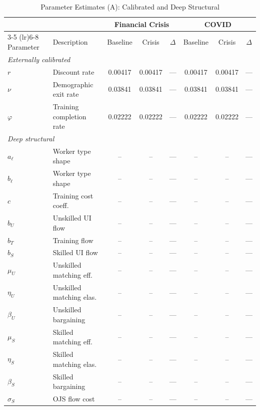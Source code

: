 \begin{table}[htbp]
  \centering
  \caption{Parameter Estimates (A): Calibrated and Deep Structural}
  \label{tab:param_estimates_a}
  \small
  \begin{tabular}{llcccccc}
    \toprule
    & & \multicolumn{3}{c}{Financial Crisis} & \multicolumn{3}{c}{COVID} \\
    \cmidrule(lr){3-5} \cmidrule(lr){6-8}
    Parameter & Description & Baseline & Crisis & $\Delta$ & Baseline & Crisis & $\Delta$ \\
    \midrule
    \multicolumn{8}{l}{\textit{Externally calibrated}} \\[2pt]
    \quad $r$ & Discount rate & 0.00417 & 0.00417 & --- & 0.00417 & 0.00417 & --- \\
    \quad $\nu$ & Demographic exit rate & 0.03841 & 0.03841 & --- & 0.03841 & 0.03841 & --- \\
    \quad $\varphi$ & Training completion rate & 0.02222 & 0.02222 & --- & 0.02222 & 0.02222 & --- \\
    [4pt]
    \hline
    \multicolumn{8}{l}{\textit{Deep structural}} \\[2pt]
    \quad $a_\ell$ & Worker type shape & -- & -- & --- & -- & -- & --- \\
    \quad $b_\ell$ & Worker type shape & -- & -- & --- & -- & -- & --- \\
    \quad $c$ & Training cost coeff. & -- & -- & --- & -- & -- & --- \\
    \quad $b_U$ & Unskilled UI flow & -- & -- & --- & -- & -- & --- \\
    \quad $b_T$ & Training flow & -- & -- & --- & -- & -- & --- \\
    \quad $b_S$ & Skilled UI flow & -- & -- & --- & -- & -- & --- \\
    \quad $\mu_U$ & Unskilled matching eff. & -- & -- & --- & -- & -- & --- \\
    \quad $\eta_U$ & Unskilled matching elas. & -- & -- & --- & -- & -- & --- \\
    \quad $\beta_U$ & Unskilled bargaining & -- & -- & --- & -- & -- & --- \\
    \quad $\mu_S$ & Skilled matching eff. & -- & -- & --- & -- & -- & --- \\
    \quad $\eta_S$ & Skilled matching elas. & -- & -- & --- & -- & -- & --- \\
    \quad $\beta_S$ & Skilled bargaining & -- & -- & --- & -- & -- & --- \\
    \quad $\sigma_S$ & OJS flow cost & -- & -- & --- & -- & -- & --- \\
    [4pt]
    \bottomrule
  \end{tabular}
\end{table}